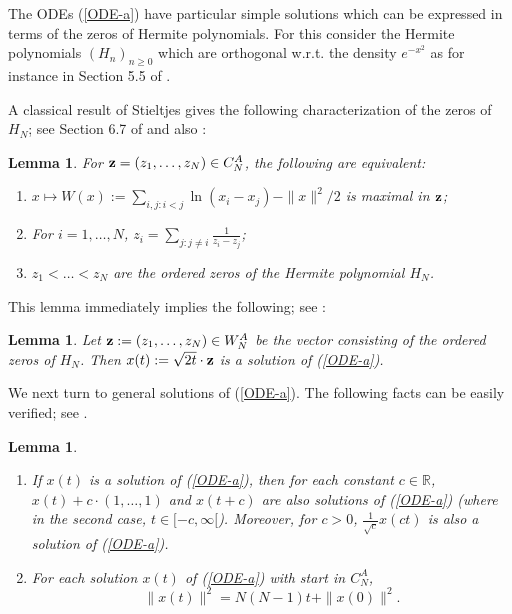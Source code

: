 \documentclass[reqno]{amsart}
\theoremstyle{plain}
\newtheorem{lemma}[theorem]{Lemma}
\theoremstyle{definition}
\numberwithin{equation}{section}
\begin{document}
The ODEs
(\ref{ODE-a}) have particular simple solutions which can be expressed in terms of the  zeros of
 Hermite polynomials. For this consider the  Hermite polynomials $(H_n)_{n\ge 0}$  which are orthogonal w.r.t.
 the density  $e^{-x^2}$ as for instance in Section 5.5 of \cite{S}.
 
 A classical result of Stieltjes gives the following characterization of the zeros of $H_N$; see Section 6.7 of \cite{S} and also
  \cite{AKM1,AV1, V}:

\begin{lemma}\label{char-zero-A}
 For $ {\bf z}=(z_1,\ldots,z_N)\in C_N^A$, the following  are equivalent:
\begin{enumerate}
\item[\rm{(1)}]  $x\mapsto W(x):=\sum_{i,j: i<j} \ln(x_i-x_j) -\|x\|^2/2$ is maximal in ${\bf z}$;
\item[\rm{(2)}] For $i=1,\ldots,N$,  $z_i= \sum_{j: j\ne i} \frac{1}{z_i-z_j}$;
\item[\rm{(3)}] $z_{1}<\ldots< z_{N}$ are
 the ordered zeros  of the Hermite polynomial $H_N$.
\end{enumerate}
\end{lemma}


This lemma immediately implies the following; see  \cite{VW1, VW2, VW3}:


\begin{lemma}\label{special-solution-a}
 Let ${\bf z}:=(z_1,\ldots,z_N)\in  W_N^A$ be the vector consisting
of the ordered zeros of  $H_N$.
Then  $x(t):=\sqrt{2t}\cdot {\bf z}$ is a solution of  (\ref{ODE-a}).
\end{lemma}

We next turn to general solutions of (\ref{ODE-a}).
The following facts can be  easily verified; see \cite{VW3}.


\begin{lemma}\label{symmetric-pol-pol-in-t}
\begin{enumerate}
\item[\rm{(1)}] If $x(t)$ is a solution of  (\ref{ODE-a}), then for each constant $c\in\mathbb R$,
  $x(t)+c\cdot(1,\ldots,1)$ and $x(t+c)$ are also  solutions of  (\ref{ODE-a})
  (where in the second case,  $t\in [-c,\infty[$). Moreover, for $c>0$,  $\frac{1}{\sqrt c} x(ct)$ is also a
    solution of  (\ref{ODE-a}).
\item[\rm{(2)}] For each solution $x(t)$ of  (\ref{ODE-a}) with start in  $ C_N^A$,
\begin{equation}\label{ODE-norm-a}
\|x(t)\|^2 =N(N-1)t+\|x(0)\|^2.
\end{equation}
\end{enumerate}
\end{lemma}
\end{document}
